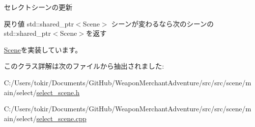 セレクトシーンの更新 

\begin{DoxyReturn}{戻り値}
std\+::shared\+\_\+ptr$<$\+Scene$>$ シーンが変わるなら次のシーンのstd\+::shared\+\_\+ptr$<$\+Scene$>$を返す 
\end{DoxyReturn}


\mbox{\hyperlink{class_scene_ab71ee5f19764b90c87b4574aa1cb1d25}{Scene}}を実装しています。



このクラス詳解は次のファイルから抽出されました\+:\begin{DoxyCompactItemize}
\item 
C\+:/\+Users/tokir/\+Documents/\+Git\+Hub/\+Weapon\+Merchant\+Adventure/src/src/scene/main/select/\mbox{\hyperlink{select__scene_8h}{select\+\_\+scene.\+h}}\item 
C\+:/\+Users/tokir/\+Documents/\+Git\+Hub/\+Weapon\+Merchant\+Adventure/src/src/scene/main/select/\mbox{\hyperlink{select__scene_8cpp}{select\+\_\+scene.\+cpp}}\end{DoxyCompactItemize}
